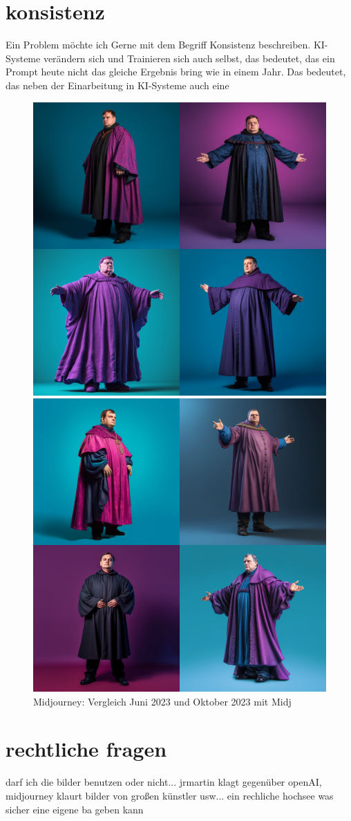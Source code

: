 \section{konsistenz}
Ein Problem möchte ich Gerne mit dem Begriff Konsistenz beschreiben.
KI-Systeme verändern sich und Trainieren sich auch selbst, das bedeutet, das ein Prompt heute nicht das gleiche Ergebnis bring wie in einem Jahr.
Das bedeutet, das neben der Einarbeitung in KI-Systeme auch eine
\begin{figure}
	\centering
	\begin{minipage}[t]{0.45\linewidth}
	\centering
	\includegraphics[width=6.405cm\linewidth]{BilderFuerBA/Sonstiges/mlAltSelberSeed}
	
	\end{minipage}
	\hfill
	\begin{minipage}[t]{0.45\linewidth}
	\centering
	\includegraphics[width=6.405cm\linewidth]{BilderFuerBA/Sonstiges/mlNeuSelberSeed}
	\end{minipage}
	\caption{Midjourney: Vergleich Juni 2023 und Oktober 2023 mit Midj}
	\label{fig:mlaltselberseed}
\end{figure}

\section{rechtliche fragen}
darf ich die bilder benutzen oder nicht... jrmartin klagt gegenüber openAI, midjourney klaurt bilder von großen künstler usw... ein rechliche hochsee was sicher eine eigene ba geben kann
